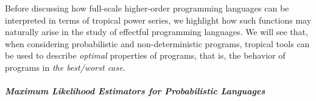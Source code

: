 
Before discussing how full-scale higher-order programming languages can be interpreted in terms of tropical power series, we highlight how such functions may naturally arise in the study of effectful programming languages.
We will see that, when considering probabilistic and non-deterministic programs, tropical tools can be used to describe \emph{optimal} properties of programs, that is, the behavior of programs in \emph{the best/worst case}.




\subparagraph*{Maximum Likelihood Estimators for Probabilistic Languages}

%



